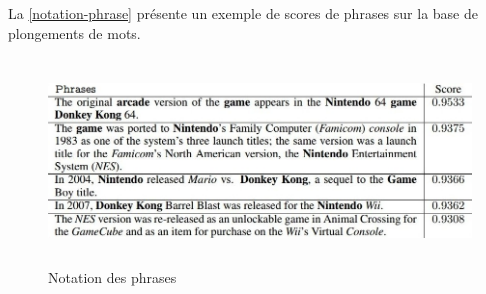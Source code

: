         La \autoref{notation-phrase} présente un exemple de scores de phrases sur la base de plongements de mots.
            \begin{figure}[H]
                \centering
                \includegraphics[height=155pt,width=400pt]{img/chapter3/scoreembed.jpg}
                \caption{Notation des phrases \cite{notreresume}}
                \label{notation-phrase}
            \end{figure}

